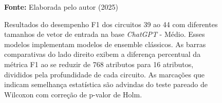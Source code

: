 \begin{figure}
\caption{Resultados do desempenho F1 dos circuitos 39 ao 44 com diferentes tamanhos de vetor de entrada na base \textit{ChatGPT} - Médio. Esses modelos implementam modelos de ensemble clássicos. As barras comparativas do lado direito exibem a diferença percentual da métrica F1 ao se reduzir de 768 atributos para 16 atributos, divididos pela profundidade de cada circuito. As marcações que indicam semelhança estatística são advindas do teste pareado de Wilcoxon com correção de p-valor de Holm.}
\label{fig:n_features:medium:g8}
     \centering
    \centering
      \par\medskip\ABNTEXfontereduzida\selectfont\textbf{Fonte:} Elaborada pelo autor (2025) \par\medskip
\end{figure}